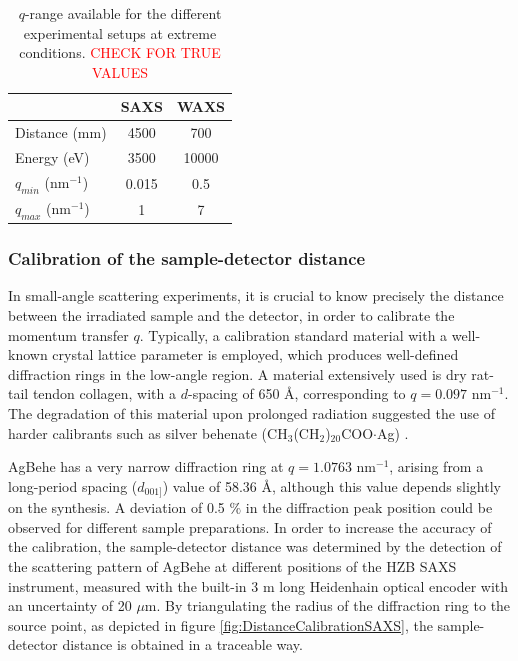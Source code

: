 \begin{table}[]
\centering
\caption{$q$-range available for the different experimental setups at extreme conditions. \textcolor{red}{CHECK FOR TRUE VALUES}}
\label{tab:qrange}
\begin{tabular}{|l|c|c|}
\hline
              & \textbf{SAXS} & \textbf{WAXS} \\ \hline
Distance (mm) & 4500          & 700           \\ \hline
Energy (eV)   & 3500          & 10000         \\ \hline
$q_{min}$ (nm$^{-1}$)   & 0.015         & 0.5           \\ \hline
$q_{max}$ (nm$^{-1}$)   & 1             & 7             \\ \hline
\end{tabular}
\end{table}

\newpage

\subsubsection{Calibration of the sample-detector distance}

In small-angle scattering experiments, it is crucial to know precisely the distance between the irradiated sample and the detector, in order to calibrate the momentum transfer $q$. Typically, a calibration standard material with a well-known crystal lattice parameter is employed, which produces well-defined diffraction rings in the low-angle region. A material extensively used is dry rat-tail tendon collagen, with a $d$-spacing of 650 \AA \citep{amenitsch_performance_1997}, corresponding to $q=0.097$ nm$^{-1}$. The degradation of this material upon prolonged radiation suggested the use of harder calibrants such as silver behenate (CH$_3$(CH$_2$)$_{20}$COO$\cdot$Ag) \citep{huang_x-ray_1993}.

AgBehe has a very narrow diffraction ring at $q=1.0763$ nm$^{-1}$, arising from a long-period spacing ($d_{001]}$) value of 58.36 \AA \citep{blanton_jcpdsinternational_1995}, although this value depends slightly on the synthesis. A deviation of 0.5 $\%$ in the diffraction peak position could be observed for different sample preparations. In order to increase the accuracy of the calibration, the sample-detector distance was determined by the detection of the scattering pattern of AgBehe at different positions of the HZB SAXS instrument, measured with the built-in 3 m long Heidenhain optical encoder with an uncertainty of 20 $\mu$m. By triangulating the radius of the diffraction ring to the source point, as depicted in figure \ref{fig:DistanceCalibrationSAXS}, the sample-detector distance is obtained in a traceable way.

